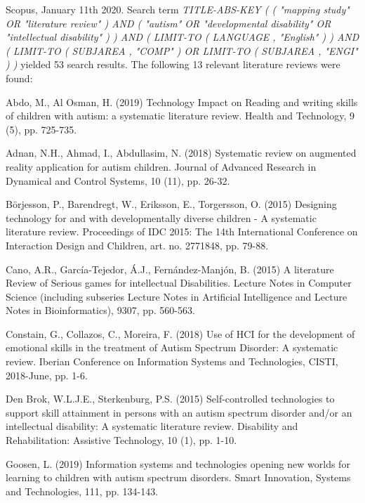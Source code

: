 \documentclass[utf8,english]{gradu3}
\begin{document}
\begin{footnotesize}
  Scopus, January 11th 2020.
  Search term \textit{TITLE-ABS-KEY ( ( "mapping study"  OR  "literature review" )  AND  ( "autism"  OR  "developmental disability"
    OR  "intellectual disability" ) )  AND  ( LIMIT-TO ( LANGUAGE ,  "English" ) )  AND  ( LIMIT-TO ( SUBJAREA ,  "COMP" )
    OR  LIMIT-TO ( SUBJAREA ,  "ENGI" ) )} yielded 53 search results. The following 13 relevant literature reviews were found:

  \begin{compactenum}
    \item Abdo, M., Al Osman, H. (2019) Technology Impact on Reading and writing skills of children with autism: a systematic literature review. Health and Technology, 9 (5), pp. 725-735.
    \item Adnan, N.H., Ahmad, I., Abdullasim, N. (2018) Systematic review on augmented reality application for autism children. Journal of Advanced Research in Dynamical and Control Systems, 10 (11), pp. 26-32.
    \item Börjesson, P., Barendregt, W., Eriksson, E., Torgersson, O. (2015) Designing technology for and with developmentally diverse children - A systematic literature review. Proceedings of IDC 2015: The 14th International Conference on Interaction Design and Children, art. no. 2771848, pp. 79-88.
    \item Cano, A.R., García-Tejedor, Á.J., Fernández-Manjón, B. (2015) A literature Review of Serious games for intellectual Disabilities. Lecture Notes in Computer Science (including subseries Lecture Notes in Artificial Intelligence and Lecture Notes in Bioinformatics), 9307, pp. 560-563.
    \item Constain, G., Collazos, C., Moreira, F. (2018) Use of HCI for the development of emotional skills in the treatment of Autism Spectrum Disorder: A systematic review. Iberian Conference on Information Systems and Technologies, CISTI, 2018-June, pp. 1-6.
    \item Den Brok, W.L.J.E., Sterkenburg, P.S. (2015) Self-controlled technologies to support skill attainment in persons with an autism spectrum disorder and/or an intellectual disability: A systematic literature review. Disability and Rehabilitation: Assistive Technology, 10 (1), pp. 1-10.
    \item Goosen, L. (2019) Information systems and technologies opening new worlds for learning to children with autism spectrum disorders. Smart Innovation, Systems and Technologies, 111, pp. 134-143.

\end{compactenum}
\end{footnotesize}
\end{document}
